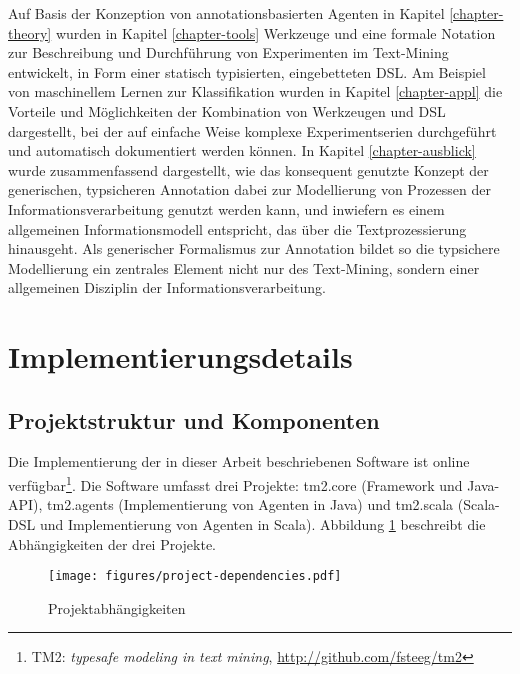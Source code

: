 \documentclass[abstracton, 12pt]{scrartcl}
\begin{document}
Auf Basis der Konzeption von annotationsbasierten Agenten in Kapitel \ref{chapter-theory} wurden in Kapitel \ref{chapter-tools} Werkzeuge und eine formale Notation zur Beschreibung und Durchführung von Experimenten im Text-Mining entwickelt, in Form einer statisch typisierten, eingebetteten DSL. Am Beispiel von maschinellem Lernen zur Klassifikation wurden in Kapitel \ref{chapter-appl} die Vorteile und Möglichkeiten der Kombination von Werkzeugen und DSL dargestellt, bei der auf einfache Weise komplexe Experimentserien durchgeführt und automatisch dokumentiert werden können. In Kapitel \ref{chapter-ausblick} wurde zusammenfassend dargestellt, wie das konsequent genutzte Konzept der generischen, typsicheren Annotation dabei zur Modellierung von Prozessen der Informationsverarbeitung genutzt werden kann, und inwiefern es einem allgemeinen Informationsmodell entspricht, das über die Textprozessierung hinausgeht. Als generischer Formalismus zur Annotation bildet so die typsichere Modellierung ein zentrales Element nicht nur des Text-Mining, sondern einer allgemeinen Disziplin der Informationsverarbeitung.

\newpage
\appendix

\section{Implementierungsdetails} \label{chapter-impl}

\subsection{Projektstruktur und Komponenten} \label{anhang-code} \label{anhang-archiv} \label{anhang-build}

Die Implementierung der in dieser Arbeit beschriebenen Software ist online verfügbar\footnote{TM2: \emph{typesafe modeling in text mining}, \url{http://github.com/fsteeg/tm2}}. Die Software umfasst drei Projekte: tm2.core (Framework und Java-API), tm2.agents (Implementierung von Agenten in Java) und tm2.scala (Scala-DSL und Implementierung von Agenten in Scala). Abbildung \ref{project-dependencies} beschreibt die Abhängigkeiten der drei Projekte.

\begin{figure}[bhtp]
\begin{center}
  \texttt{[image: figures/project-dependencies.pdf]}
  \caption[Projektabhängigkeiten]{Projektabhängigkeiten}
  \label{project-dependencies}
\end{center}
\end{figure}
\end{document}
